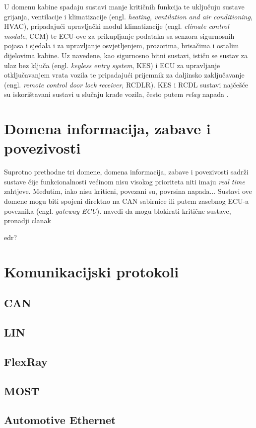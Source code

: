 \documentclass[times, utf8, diplomski, numeric]{fer}
\begin{document}
U domenu kabine spadaju sustavi manje kritičnih funkcija te uključuju sustave grijanja, ventilacije i klimatizacije (engl. \textit{heating, ventilation and air conditioning}, HVAC), pripadajući upravljački modul klimatizacije (engl. \textit{climate control module}, CCM) te ECU-ove za prikupljanje podataka sa senzora sigurnosnih pojasa i sjedala i za upravljanje osvjetljenjem, prozorima, brisačima i ostalim dijelovima kabine. Uz navedene, kao sigurnosno bitni sustavi, ističu se sustav za ulaz bez ključa (engl. \textit{keyless entry system}, KES) i ECU za upravljanje otključavanjem vrata vozila te pripadajući prijemnik za daljinsko zaključavanje (engl. \textit{remote control door lock receiver}, RCDLR). KES i RCDL sustavi najčešće su iskorištavani sustavi u slučaju krađe vozila, često putem \textit{relay} napada \cite{nasser2023automotive, cbc2020relay}.

\section{Domena informacija, zabave i povezivosti}
Suprotno prethodne tri domene, domena informacija, zabave i povezivosti sadrži sustave čije funkcionalnosti većinom nisu visokog prioriteta niti imaju \textit{real time} zahtjeve. Međutim, iako nisu kriticni, povezani su, povrsina napada... 
Sustavi ove domene mogu biti spojeni direktno na CAN sabirnice ili putem zasebnog ECU-a poveznika (engl. \textit{gateway ECU}).
navedi da mogu blokirati kritične sustave, pronadji clanak

edr?

\section{Komunikacijski protokoli}
\subsection{CAN}
\subsection{LIN}
\subsection{FlexRay}
\subsection{MOST}
\subsection{Automotive Ethernet}
\end{document}
